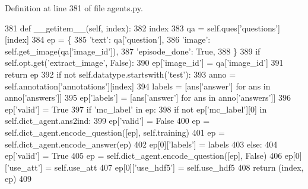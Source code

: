 Definition at line 381 of file agents.\+py.


\begin{DoxyCode}
381     \textcolor{keyword}{def }\_\_getitem\_\_(self, index):
382         index %
383         qa = self.ques[\textcolor{stringliteral}{'questions'}][index]
384         ep = \{
385             \textcolor{stringliteral}{'text'}: qa[\textcolor{stringliteral}{'question'}],
386             \textcolor{stringliteral}{'image'}: self.get\_image(qa[\textcolor{stringliteral}{'image\_id'}]),
387             \textcolor{stringliteral}{'episode\_done'}: \textcolor{keyword}{True},
388         \}
389         \textcolor{keywordflow}{if} self.opt.get(\textcolor{stringliteral}{'extract\_image'}, \textcolor{keyword}{False}):
390             ep[\textcolor{stringliteral}{'image\_id'}] = qa[\textcolor{stringliteral}{'image\_id'}]
391             \textcolor{keywordflow}{return} ep
392         \textcolor{keywordflow}{if} \textcolor{keywordflow}{not} self.datatype.startswith(\textcolor{stringliteral}{'test'}):
393             anno = self.annotation[\textcolor{stringliteral}{'annotations'}][index]
394             labels = [ans[\textcolor{stringliteral}{'answer'}] \textcolor{keywordflow}{for} ans \textcolor{keywordflow}{in} anno[\textcolor{stringliteral}{'answers'}]]
395             ep[\textcolor{stringliteral}{'labels'}] = [ans[\textcolor{stringliteral}{'answer'}] \textcolor{keywordflow}{for} ans \textcolor{keywordflow}{in} anno[\textcolor{stringliteral}{'answers'}]]
396             ep[\textcolor{stringliteral}{'valid'}] = \textcolor{keyword}{True}
397             \textcolor{keywordflow}{if} \textcolor{stringliteral}{'mc\_label'} \textcolor{keywordflow}{in} ep:
398                 \textcolor{keywordflow}{if} \textcolor{keywordflow}{not} ep[\textcolor{stringliteral}{'mc\_label'}][0] \textcolor{keywordflow}{in} self.dict\_agent.ans2ind:
399                     ep[\textcolor{stringliteral}{'valid'}] = \textcolor{keyword}{False}
400             ep = self.dict\_agent.encode\_question([ep], self.training)
401             ep = self.dict\_agent.encode\_answer(ep)
402             ep[0][\textcolor{stringliteral}{'labels'}] = labels
403         \textcolor{keywordflow}{else}:
404             ep[\textcolor{stringliteral}{'valid'}] = \textcolor{keyword}{True}
405             ep = self.dict\_agent.encode\_question([ep], \textcolor{keyword}{False})
406         ep[0][\textcolor{stringliteral}{'use\_att'}] = self.use\_att
407         ep[0][\textcolor{stringliteral}{'use\_hdf5'}] = self.use\_hdf5
408         \textcolor{keywordflow}{return} (index, ep)
409 
\end{DoxyCode}
\mbox{\label{classparlai_1_1tasks_1_1vqa__v1_1_1agents_1_1VQADataset_af309d827a13fba8f616f8608821f5543}} 
